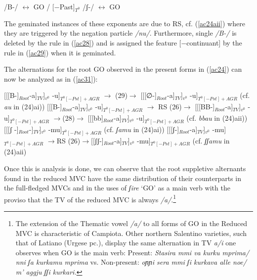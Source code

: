 \documentclass[output=paper]{langscibook}
\begin{document}
\ea\label{ac30}
    \ea \label{ac30a}/B-/ $\longleftrightarrow$ GO / \underline{\hspace{2em}}  [−Past]$_{T^0}$
    \ex\label{ac30b} /ʃ-/ $\longleftrightarrow$ GO
    \z
\z

The geminated instances of these exponents are due to RS, cf. (\ref{ac24aii}) where they are triggered by the negation particle \textit{/nu/}. Furthermore, single \textit{/B-/} is deleted by the rule in (\ref{ac28}) and is assigned the feature [−continuant] by the rule in (\ref{ac29}) when it is geminated.

The alternations for the root GO observed in the present forms in (\ref{ac24}) can now be analyzed as in (\ref{ac31}):

\ea\label{ac31}
    \ea \label{ac31a}{[[[B-]}$_{Root}$-a]$_{TV}$]$_{v^0}$ -u]$_{T^0 [−Pst]+AGR}$ $\rightarrow$ (29)$\rightarrow$ [[[∅-]$_{Root}$-a]$_{TV}$]$_{v^0}$ -u]$_{T^0 [-Pst]+AGR}$        (cf. \textit{au} in (24)ai))
    \ex \label{ac31b}{[[[B-]}$_{Root}$-a]$_{TV}$]$_{v^0}$ -u]$_{T^0 [−Pst]+AGR}$ $\rightarrow$ RS (26)$\rightarrow$ [[[BB-]$_{Root}$-a]$_{TV}$]$_{v^0}$ -u]$_{T^0 [-Pst]+AGR}$      $\rightarrow$(28)$\rightarrow$ [[[bb]$_{Root}$-a]$_{TV}$]$_{v^0}$ -u]$_{T^0 [-Pst]+AGR}$   (cf. \textit{bbau} in (24)aii))
    \ex \label{ac31c}{[[[ʃ -]}$_{Root}$-]$_{TV}$]$_{v^0}$ -mu]$_{T^0 [-Pst]+AGR}$ (cf. \textit{ʃamu} in (24)ai))
    \ex \label{ac31d}{[[[ʃ-]}$_{Root}$-a]$_{TV}$]$_{v^0}$ -mu]$_{T^0 [-Pst]+AGR}$ $\rightarrow$RS (26)$\rightarrow$[[ʃʃ-]$_{Root}$-a]$_{TV}$]$_{v^0}$ -mu]$_{T^0 [-Pst]+AGR}$           (cf. \textit{ʃʃamu} in (24)aii)
    \z
\z

Once this is analysis is done, we can observe that the root suppletive alternants found in the reduced MVC have the same distribution of their counterparts in the full-fledged MVCs and in the uses of \textit{ʃire} ‘GO’ as a main verb with the proviso that the TV of the reduced MVC is always \textit{/a/}.\footnote{The extension of the Thematic vowel \textit{/a/} to all forms of GO in the Reduced MVC is characteristic of Campiota.  Other northern  Salentino varieties, such that of Latiano (Urgese pc.), display the same alternation in TV \textit{a/i} one observes when GO is the main verb: Present: \textit{Stasira mmi va kurku mprima/ nni ʃa kurkamu mprima} vs. Non-present: \textit{oɲɲi sera mmi ʃi kurkava alle noe/ m’ aggju ʃʃi kurkari.}}
\end{document}
